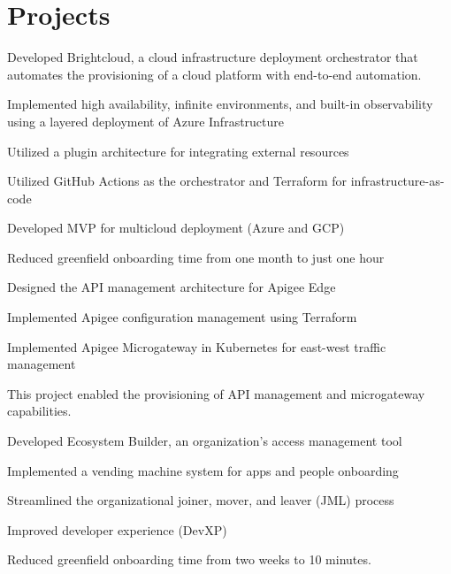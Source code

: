 \documentclass[]{de-resume}
\begin{document}
\begin{minipage}[t]{0.66\textwidth} 


\section{Projects}
\subsectionsep
{}
\subsectionsep
\begin{tightemize}
\item Developed Brightcloud, a cloud infrastructure deployment orchestrator that automates the provisioning of a cloud platform with end-to-end automation.
	\begin{tightemize}
		\sectionsep
		\item Implemented high availability, infinite environments, and built-in observability using a layered deployment of Azure Infrastructure
		\item Utilized a plugin architecture for integrating external resources
		\item Utilized GitHub Actions as the orchestrator and Terraform for infrastructure-as-code
		\item Developed MVP for multicloud deployment (Azure and GCP)
		\item Reduced greenfield onboarding time from one month to just one hour
	\end{tightemize}

\item Designed the API management architecture for Apigee Edge 
\begin{tightemize}
	\sectionsep
	\item Implemented Apigee configuration management using Terraform
	\item Implemented Apigee Microgateway in Kubernetes for east-west traffic management
	\item This project enabled the provisioning of API management and microgateway capabilities.
	\sectionsep
\end{tightemize}

\item Developed Ecosystem Builder, an organization's access management tool
\begin{tightemize}
	\sectionsep
	\item Implemented a vending machine system for apps and people onboarding
	\item Streamlined the organizational joiner, mover, and leaver (JML) process
	\item Improved developer experience (DevXP)
	\item Reduced greenfield onboarding time from two weeks to 10 minutes.
	\sectionsep
\end{tightemize}


\end{tightemize}
\end{minipage}
\end{document}
